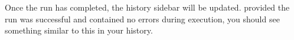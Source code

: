 \documentclass[a4paper,10pt]{article}
\begin{document}
\setlength\fboxsep{0pt}\vspace{1em}
\setlength\fboxsep{0pt}\vspace{1em}
Once the run has completed, the history sidebar will be updated.  provided the run was successful and contained no errors during execution, you should see something similar to this in your history.\vspace{1em}\\
\setlength\fboxsep{0pt}\vspace{1em}\\
\end{document}

